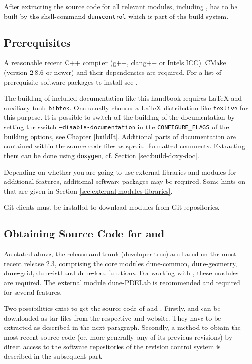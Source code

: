 After extracting the source code for all relevant \Dune modules, including \Dumux, \Dune has to be built
by the shell-command \texttt{dunecontrol} which is part of the \Dune build system.

\subsection{Prerequisites} \label{sec:prerequisites}
A reasonable recent C++ compiler (g++, clang++ or Intels ICC), CMake (version 2.8.6 or newer) and their
dependencies are required.
For a list of prerequisite software packages to install see \cite{DUNE-WIKI-PREREQUISITE-SOFTWARE}.

The building of included documentation like this handbook requires \LaTeX{} and auxiliary tools
\texttt{bibtex}. One usually chooses a \LaTeX{} distribution like \texttt{texlive} for this purpose.
It is possible to switch off the building of the documentation by setting the switch \texttt{--disable-documentation}
in the \texttt{CONFIGURE\_FLAGS} of the building options, see Chapter \ref{buildIt}.
Additional parts of documentation are contained within the source code files as special formatted comments.
Extracting them can be done using \texttt{doxygen}, cf. Section \ref{sec:build-doxy-doc}.

Depending on whether you are going to use external libraries and modules for additional \Dune features,
additional software packages may be required. Some hints on that are given in Section \ref{sec:external-modules-libraries}.

Git clients must be installed to download modules from Git repositories.

\subsection{Obtaining Source Code for \Dune and \Dumux}
As stated above, the \Dumux release and trunk (developer tree) are based on the most recent
\Dune release 2.3, comprising the core modules dune-common, dune-geometry, dune-grid,
dune-istl and dune-localfunctions. For working with \Dumux, these modules are required. The
external module dune-PDELab is recommended and required for several \Dumux features.

Two possibilities exist to get the source code of \Dune and \Dumux.
Firstly, \Dune and \Dumux can be downloaded as tar files from the respective \Dune and \Dumux website.
They have to be extracted as described in the next paragraph.
Secondly, a method to obtain the most recent source code (or, more generally, any of its previous revisions) by direct access
to the software repositories of the revision control system is described in the subsequent part.

